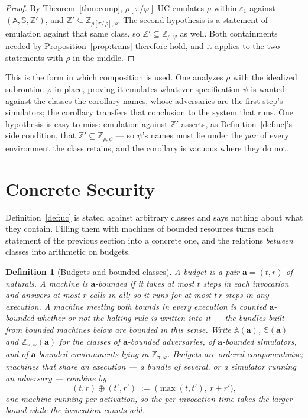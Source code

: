 \documentclass[11pt,a4paper]{article}
\newcommand{\pars}{\mathit{par}}
\newcommand{\bd}[1]{\mathbf{#1}}
\newcommand{\Aset}{\mathbb{A}}
\newcommand{\SimSet}{\mathbb{S}}
\newcommand{\ZenvSet}{\mathbb{Z}}
\theoremstyle{accentdef}
\newtheorem{definition}{Definition}[section]
\theoremstyle{accentplain}
\begin{document}
\begin{proof}
By Theorem~\ref{thm:comp}, $\rho[\pi/\varphi]$ UC-emulates $\rho$ within $\varepsilon_1$
against $(\Aset,\SimSet,\ZenvSet')$, and $\ZenvSet' \subseteq \ZenvSet_{\rho[\pi/\varphi],\rho}$.
The second hypothesis is a statement of emulation against that same class, so $\ZenvSet' \subseteq \ZenvSet_{\rho,\psi}$
as well. Both containments needed by Proposition~\ref{prop:trans} therefore hold, and it
applies to the two statements with $\rho$ in the middle.
\end{proof}

This is the form in which composition is used. One analyzes $\rho$ with the idealized subroutine
$\varphi$ in place, proving it emulates whatever specification $\psi$ is wanted --- against the
classes the corollary names, whose adversaries are the first step's simulators; the corollary
transfers that conclusion to the system that runs. One hypothesis is easy to miss: emulation
against $\ZenvSet'$ asserts, as Definition~\ref{def:uc}'s side condition, that
$\ZenvSet' \subseteq \ZenvSet_{\rho,\psi}$ --- so $\psi$'s names must lie under the $\pars$ of
every environment the class retains, and the corollary is vacuous where they do not.

\section{Concrete Security}\label{sec:concrete}

Definition~\ref{def:uc} is stated against arbitrary classes and says nothing about what they
contain. Filling them with machines of bounded resources turns each statement of the previous
section into a concrete one, and the relations \emph{between} classes into arithmetic on budgets.

\begin{definition}[Budgets and bounded classes]\label{def:res}
A \emph{budget} is a pair $\bd{a} = (t,r)$ of naturals. A machine is \emph{$\bd{a}$-bounded} if
it takes at most $t$ steps in each invocation and answers at most $r$ calls in all; so it runs
for at most $t\,r$ steps in any execution. A machine meeting both bounds in every execution is
counted $\bd{a}$-bounded whether or not the halting rule is written into it --- the bundles built
from bounded machines below are bounded in this sense. Write
$\Aset(\bd{a})$, $\SimSet(\bd{a})$ and $\ZenvSet_{\pi,\varphi}(\bd{a})$ for the classes of
$\bd{a}$-bounded adversaries, of $\bd{a}$-bounded simulators, and of $\bd{a}$-bounded
environments lying in $\ZenvSet_{\pi,\varphi}$. Budgets are ordered componentwise; machines that
share an execution --- a bundle of several, or a simulator running an adversary --- combine by
\[
  (t,r) \oplus (t',r') \;:=\; \bigl(\max(t,t'),\ r + r'\bigr) ,
\]
one machine running per activation, so the per-invocation time takes the larger bound while the
invocation counts add.
\end{definition}
\end{document}
